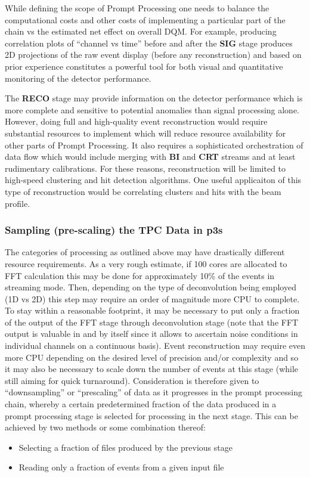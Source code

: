 \documentclass[pdftex,12pt,letter]{article}
\newcommand{\PP}{Prompt Processing\xspace}
\newcommand{\PPS}{\textbf{p3s}\xspace}
\begin{document}
While defining the scope of \PP one needs to balance the computational costs and other costs of implementing
a particular part of the chain vs the estimated net effect on overall DQM. For example, producing correlation
plots of ``channel vs time'' before and after the \textbf{SIG} stage produces 2D projections of the raw event
display (before any reconstruction) and based on prior experience constitutes a powerful tool for both
visual and quantitative monitoring of the detector performance.

The \textbf{RECO} stage may provide information on the detector performance which is more complete
and sensitive to potential anomalies than signal processing alone. However, doing full and high-quality
event reconstruction would require substantial resources to implement which will reduce resource availability
for other parts of \PP. It also requires a sophisticated orchestration of data flow which would include
merging with \textbf{BI} and \textbf{CRT} streams and at least rudimentary calibrations. 
For these reasons, reconstruction will be limited to high-speed clustering and hit detection algorithms.
One useful applicaiton of this type of reconstruction would be correlating clusters and hits with
the beam profile.

\subsubsection{Sampling (pre-scaling) the TPC Data in \PPS}
\label{sec:downsampling}
The categories of processing as outlined above may have drastically different resource requirements.
As a very rough estimate, if 100 cores are allocated to FFT calculation this may be done for approximately 10\% of the events
in streaming mode. Then, depending on the type of deconvolution being employed (1D vs 2D) this step
may require an order of magnitude more CPU to complete. To stay within a reasonable footprint,
it may be necessary to put only a fraction of the output of the FFT stage through deconvolution stage
(note that the FFT output is valuable in and by itself since it allows to ascertain noise conditions in individual channels
on a continuous basis). Event reconstruction may require even more CPU depending on the desired level of precision and/or
complexity and so it may also be necessary to scale down the number of events at this stage
(while still aiming for quick turnaround). Consideration is therefore given to ``downsampling'' or ``prescaling'' 
of data as it progresses in the prompt processing chain, whereby a certain predetermined fraction of the data
produced in a prompt processing stage is selected for processing in the next stage.
This can be achieved by two methods or some combination thereof:
\begin{itemize}
\item Selecting a fraction of files produced by the previous stage
\item Reading only a fraction of events from a given input file
\end{itemize}
\end{document}
